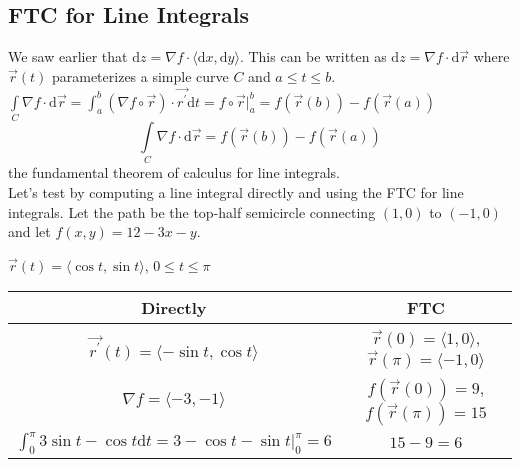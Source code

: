 \subsection{FTC for Line Integrals}
\noindent
We saw earlier that $\mathrm{d}z = \nabla f \cdot \langle \mathrm{d}x, \mathrm{d}y \rangle$. This can be written as $\mathrm{d}z = \nabla f \cdot \mathrm{d}\vec{r}$ where $\vec{r}(t)$ parameterizes a simple curve $C$ and $a \leq t \leq b$.\\
$\int\limits_{C}{\nabla f \cdot \mathrm{d}\vec{r}} = \int_{a}^{b}{(\nabla f\circ\vec{r}) \cdot \vec{r^\prime}\mathrm{d}t} = f\circ\vec{r}\rvert_{a}^{b} = f(\vec{r}(b))-f(\vec{r}(a))$
\begin{equation*}
	\int\limits_{C}{\nabla f\cdot\mathrm{d}\vec{r}}=f(\vec{r}(b))-f(\vec{r}(a))
\end{equation*}
the fundamental theorem of calculus for line integrals.\\

\noindent
Let's test by computing a line integral directly and using the FTC for line integrals. Let the path be the top-half semicircle connecting $(1,0)$ to $(-1,0)$ and let $f(x,y) = 12 - 3x - y$.
\begin{center}
	$\vec{r}(t)=\langle\cos{t},\sin{t}\rangle$, $0\leq t\leq\pi$
	\begin{tabular}{c|c}
		Directly & FTC \\ \hline
		$\vec{r^\prime}(t) = \langle-\sin{t}, \cos{t}\rangle$ & $\vec{r}(0) = \langle 1, 0 \rangle$, $\vec{r}(\pi) = \langle -1, 0 \rangle$ \\
		$\nabla f = \langle -3, -1 \rangle$ & $f(\vec{r}(0)) = 9$, $f(\vec{r}(\pi)) = 15$ \\
		$\int_{0}^{\pi}{3\sin{t} - \cos{t}\mathrm{d}t} = 3 - \cos{t} - \sin{t}\rvert_{0}^{\pi} = 6$ & $15 - 9 = 6$ \\
	\end{tabular}
\end{center}

